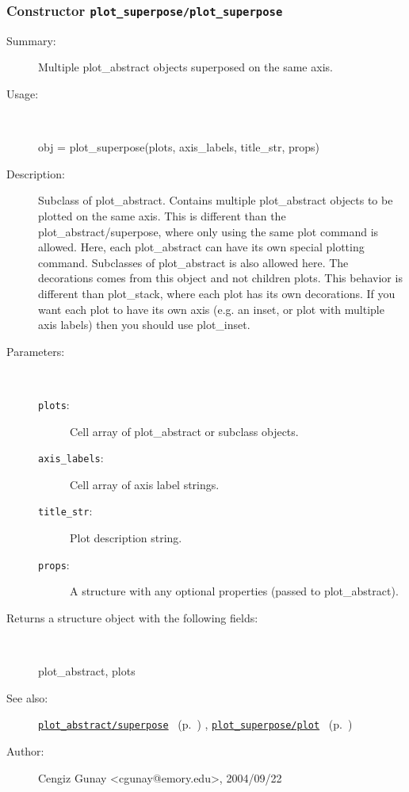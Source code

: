 \subsubsection[Constructor \texttt{plot\_superpose}]{Constructor \texttt{plot\_superpose/plot\_superpose}}%
%
\label{ref_plot_superpose__plot_superpose}%
\hypertarget{ref_plot_superpose__plot_superpose}{}%
\begin{description}
\item[Summary:]Multiple plot\_abstract objects superposed on the same axis.
%
\item[Usage:]~%
\begin{lyxcode}%
obj = plot\_superpose(plots, axis\_labels, title\_str, props)
%
\end{lyxcode}%
%
\item[Description:]%
Subclass of plot\_abstract. Contains multiple plot\_abstract objects to be
 plotted on the same axis. This is different than the
 plot\_abstract/superpose, where only using the same plot command is
 allowed.  Here, each plot\_abstract can have its own special plotting
 command. Subclasses of plot\_abstract is also allowed here. The decorations
 comes from this object and not children plots. This behavior is different
 than plot\_stack, where each plot has its own decorations. If you want each
 plot to have its own axis (e.g. an inset, or plot with multiple axis
 labels) then you should use plot\_inset.
\item[Parameters:]~
\begin{description}%
\item[\texttt{plots}:]
 Cell array of plot\_abstract or subclass objects.
\item[\texttt{axis\_labels}:]
 Cell array of axis label strings.
\item[\texttt{title\_str}:]
 Plot description string.
\item[\texttt{props}:]
 A structure with any optional properties (passed to plot\_abstract).
\end{description}%
%
\item[Returns a structure object with the following fields:]~

	plot\_abstract, plots
%
%
\item[See also:]%
\hyperlink{ref_plot_abstract__superpose}{\texttt{plot\_abstract/superpose}}%
\ (p.~\pageref{ref_plot_abstract__superpose})%
%
, \hyperlink{ref_plot_superpose__plot}{\texttt{plot\_superpose/plot}}%
\ (p.~\pageref{ref_plot_superpose__plot})%
%
%
\item[Author:]%
Cengiz Gunay <cgunay@emory.edu>, 2004/09/22%
\end{description}
\methodline%
